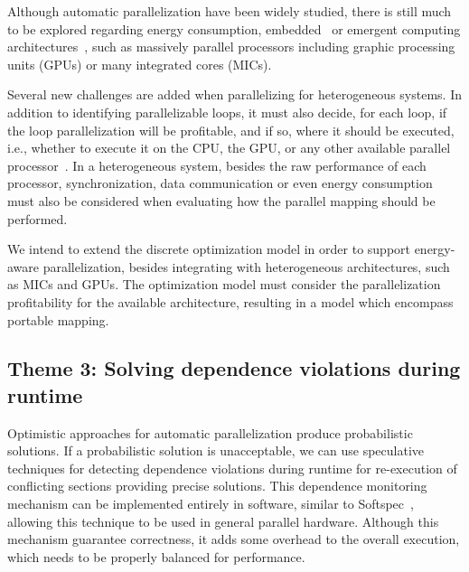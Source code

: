 \documentclass[a4paper,12pt]{article}
\begin{document}
Although automatic parallelization have been widely studied, there is still
much to be explored regarding energy consumption, embedded~\cite{cordes10} or
emergent computing
architectures~\cite{leung09,baskaran10,amini12,govindarajan13}, such as
massively parallel processors including graphic processing units (GPUs) or many
integrated cores (MICs).

Several new challenges are added when parallelizing for heterogeneous systems.
In addition to identifying parallelizable loops, it must also decide, for each
loop, if the loop parallelization will be profitable, and if so, where it
should be executed, i.e., whether to execute it on the CPU, the GPU, or any
other available parallel processor~\cite{tournavitis09,wang14a,leung09}.  In a
heterogeneous system, besides the raw performance of each processor,
synchronization, data communication or even energy consumption must also be
considered when evaluating how the parallel mapping should be performed.

We intend to extend the discrete optimization model in order to support
energy-aware parallelization, besides integrating with heterogeneous
architectures, such as MICs and GPUs.  The optimization model must consider the
parallelization profitability for the available architecture,
resulting in a model which encompass portable mapping.

\subsection{Theme 3: Solving dependence violations during runtime}


Optimistic approaches for automatic parallelization produce probabilistic
solutions.  If a probabilistic solution is unacceptable, we can use speculative
techniques for detecting dependence violations during runtime for re-execution
of conflicting sections providing precise solutions.  This dependence
monitoring mechanism can be implemented entirely in software, similar to
Softspec~\cite{bruening98}, allowing this technique to be used in general
parallel hardware.  Although this mechanism guarantee correctness, it adds some
overhead to the overall execution, which needs to be properly balanced for
performance.
\end{document}

